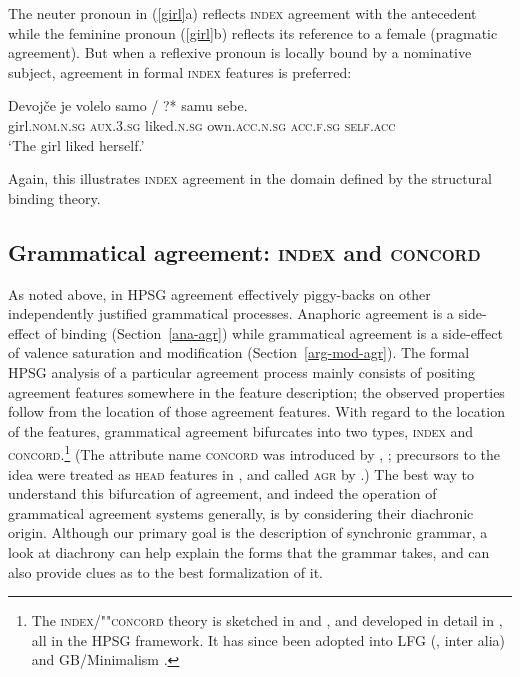 \documentclass[output=paper
 	        ,biblatex
                ,babelshorthands
                ,newtxmath
                ,draftmode
                ,colorlinks, citecolor=brown
]{langscibook}
\begin{document}
\noindent
The neuter pronoun in (\ref{girl}a) reflects \textsc{index} agreement
with the antecedent while the feminine pronoun (\ref{girl}b) reflects its reference to a female (pragmatic agreement).  But when a reflexive pronoun is locally bound  by a nominative subject, agreement in  formal \textsc{index} features is preferred:

\begin{exe}
\ex \label{girl2}
\gll 	Devojče            je               volelo              samo                  /  ?* samu              sebe. \\
        girl.\textsc{nom.n.sg} \textsc{aux.3.sg} liked.\textsc{n.sg} own.\textsc{acc.n.sg} {} {} \textsc{acc.f.sg} \textsc{self}.\textsc{acc} \\
\glt `The girl liked herself.'
\end{exe}

\noindent
Again, this illustrates \textsc{index} agreement in the domain defined by the structural binding theory.



\subsection{Grammatical agreement: \textsc{index} and \textsc{concord}}
\label{ind-con}\label{agreement-sec-index-concord}

As noted above, in  HPSG agreement effectively piggy-backs on other independently justified grammatical processes.  Anaphoric agreement is a side-effect of binding (Section~\ref{ana-agr}) while  grammatical agreement is a side-effect of valence saturation and modification (Section~\ref{arg-mod-agr}).  The formal HPSG analysis of a particular agreement process mainly consists of positing agreement features somewhere in the feature description; the observed properties follow from the location of those agreement features.  With regard to the location of the features, grammatical agreement bifurcates into two types, \textsc{index} and \textsc{concord}.\footnote{The \textsc{index}/""\textsc{concord} theory is sketched in  \citet[Chapter~2]{Pollard+Sag:1994} and \citet{Kathol99b}, and developed in detail in  \citet{Wechsler+Zlatic:2000,Wechsler+Zlatic:2003}, all in the HPSG framework.  It has since been adopted into LFG (\citealt{king+dalrymple:2004}, inter alia) and GB/Minimalism \citep{Danon:2009}.}  (The attribute name  \textsc{concord} was introduced by \citealt[799]{Wechsler+Zlatic:2000}, \citealt[14]{Wechsler+Zlatic:2003}; precursors to the idea were treated as \textsc{head} features in \citealt[Section~2.5.1]{Pollard+Sag:1994}, and called \textsc{agr} by \citealt{Kathol99b}.)   The best way to understand this bifurcation of agreement, and indeed the operation of grammatical agreement systems generally, is by considering their diachronic origin.   Although our primary goal is the description of synchronic grammar, a look at diachrony can help explain the forms that the grammar takes, and can also provide clues as to the best formalization of it.  
\end{document}
